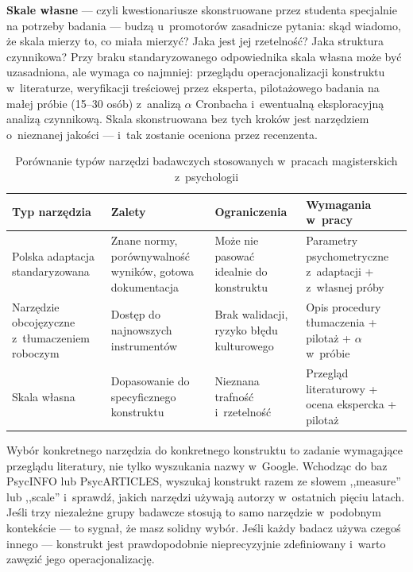 \documentclass[12pt,a4paper,twoside,openany]{book}
\begin{document}
\textbf{Skale własne} --- czyli kwestionariusze skonstruowane przez studenta specjalnie na potrzeby badania --- budzą u~promotorów zasadnicze pytania: skąd wiadomo, że skala mierzy to, co miała mierzyć? Jaka jest jej rzetelność? Jaka struktura czynnikowa? Przy braku standaryzowanego odpowiednika skala własna może być uzasadniona, ale wymaga co najmniej: przeglądu operacjonalizacji konstruktu w~literaturze, weryfikacji treściowej przez eksperta, pilotażowego badania na małej próbie (15--30 osób) z~analizą $\alpha$ Cronbacha i~ewentualną eksploracyjną analizą czynnikową. Skala skonstruowana bez tych kroków jest narzędziem o~nieznanej jakości --- i~tak zostanie oceniona przez recenzenta.

\begin{table}[ht]
\centering
\caption{Porównanie typów narzędzi badawczych stosowanych w~pracach magisterskich z~psychologii}
\begin{tabularx}{\textwidth}{lXXl}
\toprule
\rowcolor{tableheadbg} \textcolor{tableheadfg}{\textbf{Typ narzędzia}} & \textcolor{tableheadfg}{\textbf{Zalety}} & \textcolor{tableheadfg}{\textbf{Ograniczenia}} & \textcolor{tableheadfg}{\textbf{Wymagania w~pracy}} \\
\midrule
Polska adaptacja standaryzowana & Znane normy, porównywalność wyników, gotowa dokumentacja & Może nie pasować idealnie do konstruktu & Parametry psychometryczne z~adaptacji + z~własnej próby \\
Narzędzie obcojęzyczne z~tłumaczeniem roboczym & Dostęp do najnowszych instrumentów & Brak walidacji, ryzyko błędu kulturowego & Opis procedury tłumaczenia + pilotaż + $\alpha$ w~próbie \\
Skala własna & Dopasowanie do specyficznego konstruktu & Nieznana trafność i~rzetelność & Przegląd literaturowy + ocena ekspercka + pilotaż \\
\bottomrule
\end{tabularx}
\end{table}

Wybór konkretnego narzędzia do konkretnego konstruktu to zadanie wymagające przeglądu literatury, nie tylko wyszukania nazwy w~Google. Wchodząc do baz PsycINFO lub PsycARTICLES, wyszukaj konstrukt razem ze słowem ,,measure'' lub ,,scale'' i~sprawdź, jakich narzędzi używają autorzy w~ostatnich pięciu latach. Jeśli trzy niezależne grupy badawcze stosują to samo narzędzie w~podobnym kontekście --- to sygnał, że masz solidny wybór. Jeśli każdy badacz używa czegoś innego --- konstrukt jest prawdopodobnie nieprecyzyjnie zdefiniowany i~warto zawęzić jego operacjonalizację.
\end{document}
